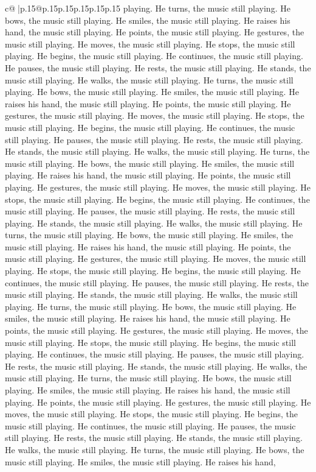 \documentclass{article}
\begin{document}
{\begin{supertabular}{c@{$\;$}|p{.15\linewidth}@{}p{.15\linewidth}p{.15\linewidth}p{.15\linewidth}p{.15\linewidth}p{.15\linewidth}}
{{{playing. He turns, the music still playing. He bows, the music still playing. He smiles, the music still playing. He raises his hand, the music still playing. He points, the music still playing. He gestures, the music still playing. He moves, the music still playing. He stops, the music still playing. He begins, the music still playing. He continues, the music still playing. He pauses, the music still playing. He rests, the music still playing. He stands, the music still playing. He walks, the music still playing. He turns, the music still playing. He bows, the music still playing. He smiles, the music still playing. He raises his hand, the music still playing. He points, the music still playing. He gestures, the music still playing. He moves, the music still playing. He stops, the music still playing. He begins, the music still playing. He continues, the music still playing. He pauses, the music still playing. He rests, the music still playing. He stands, the music still playing. He walks, the music still playing. He turns, the music still playing. He bows, the music still playing. He smiles, the music still playing. He raises his hand, the music still playing. He points, the music still playing. He gestures, the music still playing. He moves, the music still playing. He stops, the music still playing. He begins, the music still playing. He continues, the music still playing. He pauses, the music still playing. He rests, the music still playing. He stands, the music still playing. He walks, the music still playing. He turns, the music still playing. He bows, the music still playing. He smiles, the music still playing. He raises his hand, the music still playing. He points, the music still playing. He gestures, the music still playing. He moves, the music still playing. He stops, the music still playing. He begins, the music still playing. He continues, the music still playing. He pauses, the music still playing. He rests, the music still playing. He stands, the music still playing. He walks, the music still playing. He turns, the music still playing. He bows, the music still playing. He smiles, the music still playing. He raises his hand, the music still playing. He points, the music still playing. He gestures, the music still playing. He moves, the music still playing. He stops, the music still playing. He begins, the music still playing. He continues, the music still playing. He pauses, the music still playing. He rests, the music still playing. He stands, the music still playing. He walks, the music still playing. He turns, the music still playing. He bows, the music still playing. He smiles, the music still playing. He raises his hand, the music still playing. He points, the music still playing. He gestures, the music still playing. He moves, the music still playing. He stops, the music still playing. He begins, the music still playing. He continues, the music still playing. He pauses, the music still playing. He rests, the music still playing. He stands, the music still playing. He walks, the music still playing. He turns, the music still playing. He bows, the music still playing. He smiles, the music still playing. He raises his hand, }}}
\end{supertabular}}
\end{document}
